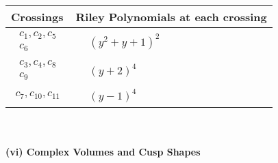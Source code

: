 \documentclass[1p]{elsarticle_modified}
\theoremstyle{definition}
\begin{document}
\begin{tabular}{m{50pt}|m{274pt}}
Crossings & \hspace{64pt}Riley Polynomials at each crossing \\
\hline $$\begin{aligned}c_{1},c_{2},c_{5}\\c_{6}\end{aligned}$$&$\begin{aligned}
&(y^2+y+1)^2
\end{aligned}$\\
\hline $$\begin{aligned}c_{3},c_{4},c_{8}\\c_{9}\end{aligned}$$&$\begin{aligned}
&(y+2)^4
\end{aligned}$\\
\hline $$\begin{aligned}c_{7},c_{10},c_{11}\end{aligned}$$&$\begin{aligned}
&(y-1)^4
\end{aligned}$\\
\hline
\end{tabular}\\~\\
\newpage\flushleft \textbf{(vi) Complex Volumes and Cusp Shapes}
\end{document}
